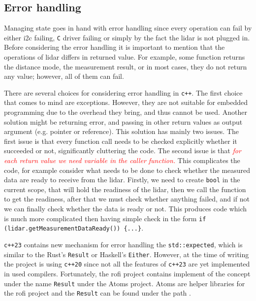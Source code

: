 \documentclass[
  digital,     %
  oneside,     %
  nosansbold,  %
  nocolorbold, %
  lof,         %
  lot,         %
]{fithesis4}
\newcommand{\TODO}[1]{\textcolor{red}{\textit{#1}}}
\begin{document}
{{{\subsection{Error handling}
Managing state goes in hand with error handling since every operation can fail by either \acrshort{i2c} failing, \verb|C| driver failing or simply by the fact the \acrshort{lidar} is not plugged in. Before considering the error handling it is important to mention that the operations of \acrshort{lidar} differs in returned value. For example, some function returns the distance mode, the measurement result, or in most cases, they do not return any value; however, all of them can fail.

There are several choices for considering error handling in \verb|c++|. The first choice that comes to mind are exceptions. However, they are not suitable for embedded programming due to the overhead they bring, and thus cannot be used. Another solution might be returning error, and passing in other return values as output argument (e.g. pointer or reference). This solution has mainly two issues. The first issue is that every function call needs to be checked explicitly whether it succeeded or not, significantly cluttering the code. The second issue is that \TODO{for each return value we need variable in the caller function.} This complicates the code, for example consider what needs to be done to check whether the measured data are ready to receive from the \acrshort{lidar}. Firstly, we need to create \lstinline|bool| in the current scope, that will hold the readiness of the \acrshort{lidar}, then we call the function to get the readiness, after that we must check whether anything failed, and if not we can finally check whether the data is ready or not. This produces code which is much more complicated then having simple check in the form \lstinline[breaklines=false]|if (lidar.getMeasurementDataReady()) {...}|.

\verb|c++23| contains new mechanism for error handling the \lstinline|std::expected|, which is similar to the Rust's \lstinline|Result| or Haskell's \lstinline|Either|. However, at the time of writing the project is using \verb|c++20| since not all the features of \verb|c++23| are yet implemented in used compilers. Fortunately, the \acrshort{rofi} project contains implement of the concept under the name \lstinline|Result| under the Atoms project. Atoms are helper libraries for the \acrshort{rofi} project and the \lstinline|Result| can be found under the path .

}}}
\end{document}
